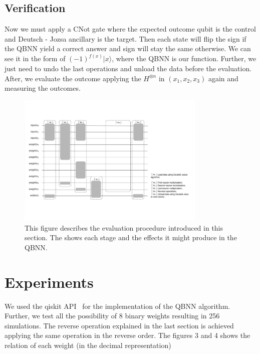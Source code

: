 \documentclass[conference]{IEEEtran}
\begin{document}
\subsection{Verification}\label{subsec:verification}
  Now we must apply a CNot gate where the expected outcome qubit is the control and Deutsch - Jozsa ancillary is the target.
 Then each state will flip the sign if the QBNN yield a correct answer and sign will stay the same otherwise.
 We can see it in the form of \((-1)^{f(x)}|x\rangle\), where the QBNN is our function.
 Further, we just need to undo the last operations and unload the data before the evaluation.
 After, we evaluate the outcome applying the $H^{\otimes n}$ in $(x_1, x_2, x_3)$ again and measuring the outcomes.

\begin{figure}[h!]
    \centering
    \includegraphics[width=9cm, scale=0.5]{images/all_circuit-converted.pdf}
    \caption{This figure describes the evaluation procedure introduced in this section.
    The shows each stage and the effects it might produce in the QBNN.}\label{Fig:Stages}
\end{figure}



\section{Experiments}\label{sec:experiments}

    We used the qiskit API~\cite{Qiskit} for the implementation of the QBNN algorithm.
    Further, we test all the possibility of 8 binary weights resulting in 256 simulations.
    The reverse operation explained in the last section is achieved applying the same operation in the reverse order.
    The figures 3 and 4 shows the relation of each weight (in the decimal representation)
\end{document}

